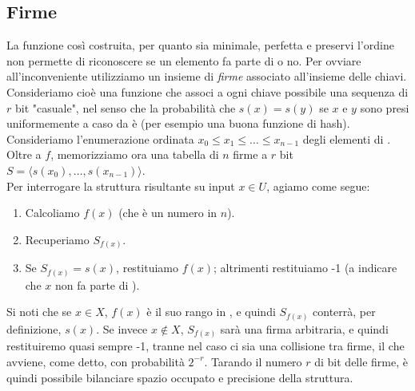 \subsection{Firme}
La funzione così costruita, per quanto sia minimale, perfetta e preservi l'ordine non permette di riconoscere se un elemento fa parte di  o no. Per ovviare all'inconveniente utilizziamo un insieme di \textit{firme} associato all'insieme  delle chiavi. Consideriamo cioè una funzione  che associ a ogni chiave possibile una sequenza di $r$ bit "casuale", nel senso che la probabilità che $s(x) = s(y)$ se $x$ e $y$ sono presi uniformemente a caso da  è  (per esempio una buona funzione di hash). Consideriamo l'enumerazione ordinata $x_0 \leq x_1 \leq \dots \leq x_{n - 1}$ degli elementi di . Oltre a $f$, memorizziamo ora una tabella di $n$ firme a $r$ bit $S = \langle s(x_0), \dots, s(x_{n - 1})\rangle$.\\
Per interrogare la struttura risultante su input $x \in U$, agiamo come segue:
\begin{enumerate}
    \item Calcoliamo $f(x)$ (che è un numero in $n$).
    \item Recuperiamo $S_{f(x)}$.
    \item Se $S_{f(x)} = s(x)$, restituiamo $f(x)$; altrimenti restituiamo -1 (a indicare che $x$ non fa parte di ).
\end{enumerate}
Si noti che se $x \in X$, $f(x)$ è il suo rango in , e quindi $S_{f(x)}$ conterrà, per definizione, $s(x)$.
Se invece $x \notin X$, $S_{f(x)}$ sarà una firma arbitraria, e quindi restituiremo quasi sempre -1, tranne nel caso ci sia una collisione tra firme, il che avviene, come detto, con probabilità $2^{-r}$. Tarando il numero $r$ di bit delle firme, è quindi possibile bilanciare spazio occupato e precisione della struttura.\\
